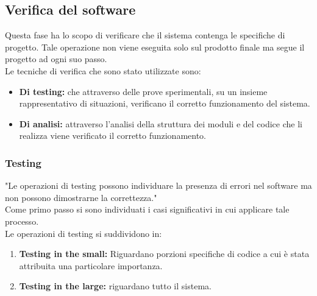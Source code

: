 \documentclass[a4paper,final,12pt]{report}
\begin{document}
\subsection{Verifica del software}
Questa fase ha lo scopo di verificare che il sistema contenga le specifiche di progetto. Tale operazione non viene eseguita solo sul prodotto finale ma segue il progetto ad ogni suo passo.\\
Le tecniche di verifica che sono stato utilizzate sono:
\begin{itemize}
\item \textbf{Di testing:} che attraverso delle prove sperimentali, su un insieme rappresentativo di situazioni, verificano il corretto funzionamento del sistema. 
\item \textbf{Di analisi:} attraverso l'analisi della struttura dei moduli e del codice che li realizza viene verificato il corretto funzionamento. 
\end{itemize}

\subsubsection{Testing}
"Le operazioni di testing possono individuare la presenza di errori nel software ma non possono dimostrarne la correttezza."\cite{1}\\
Come primo passo si sono individuati i casi significativi in cui applicare tale processo.\\
Le operazioni di testing si suddividono in:
\begin{enumerate}
\item \textbf{Testing in the small:} Riguardano porzioni specifiche di codice a cui è stata attribuita una particolare importanza.
\item \textbf{Testing in the large:} riguardano tutto il sistema.
\end{enumerate}
\end{document}
